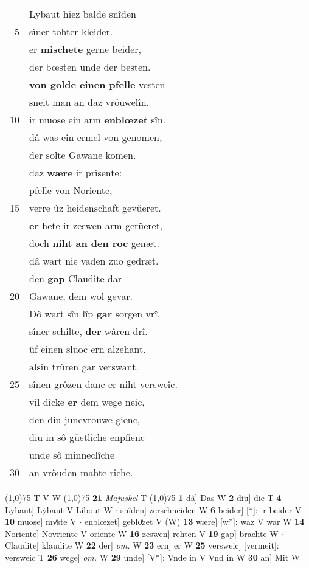 \documentclass[8pt,a4paper,notitlepage]{article}
\begin{document}
\begin{table}[ht]
\begin{minipage}[t]{0.5\linewidth}
\begin{tabular}{rl}
 & Lybaut hiez balde snîden\\ 
5 & sîner tohter kleider.\\ 
 & er \textbf{mischete} gerne beider,\\ 
 & der bœsten unde der besten.\\ 
 & \textbf{von golde einen pfelle} vesten\\ 
 & sneit man an daz vröuwelîn.\\ 
10 & ir muose ein arm \textbf{enblœzet} sîn.\\ 
 & dâ was ein ermel von genomen,\\ 
 & der solte Gawane komen.\\ 
 & daz \textbf{wære} ir prîsente:\\ 
 & pfelle von Noriente,\\ 
15 & verre ûz heidenschaft gevüeret.\\ 
 & \textbf{er} hete ir zeswen arm gerüeret,\\ 
 & doch \textbf{niht an den roc} genæt.\\ 
 & dâ wart nie vaden zuo gedræt.\\ 
 & den \textbf{gap} Claudite dar\\ 
20 & Gawane, dem wol gevar.\\ 
 & Dô wart sîn lîp \textbf{gar} sorgen vrî.\\ 
 & sîner schilte, \textbf{der} wâren drî.\\ 
 & ûf einen sluoc ern alzehant.\\ 
 & alsîn trûren gar verswant.\\ 
25 & sînen grôzen danc er niht versweic.\\ 
 & vil dicke \textbf{er} dem wege neic,\\ 
 & den diu juncvrouwe gienc,\\ 
 & diu in sô güetliche enpfienc\\ 
 & unde sô minneclîche\\ 
30 & an vröuden mahte rîche.\\ 
\end{tabular}
\scriptsize
\line(1,0){75} \newline
T V W \newline
\line(1,0){75} \newline
\textbf{21} \textit{Majuskel} T  \newline
\line(1,0){75} \newline
\textbf{1} dâ] Das W \textbf{2} diu] die T \textbf{4} Lybaut] Lẏbaut V Libout W  $\cdot$ snîden] zerschneiden W \textbf{6} beider] [*]: ir beider V \textbf{10} muose] mvͤste V  $\cdot$ enblœzet] gebloͤzet V (W) \textbf{13} wære] [w*]: waz V war W \textbf{14} Noriente] Novriente V oriente W \textbf{16} zeswen] rehten V \textbf{19} gap] brachte W  $\cdot$ Claudite] klaudite W \textbf{22} der] \textit{om.} W \textbf{23} ern] er W \textbf{25} versweic] [vermeit]: versweic T \textbf{26} wege] \textit{om.} W \textbf{29} unde] [V*]: Vnde in V Vnd in W \textbf{30} an] Mit W \newline
\end{minipage}
\end{table}
\end{document}
